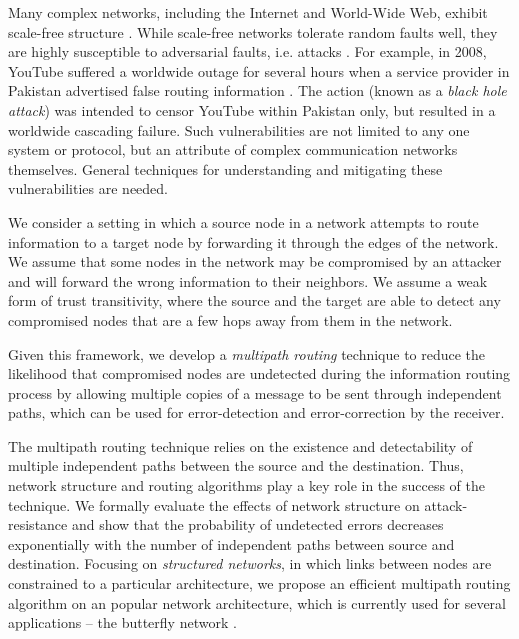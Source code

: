 \documentclass[prodmode,permissions]{acmsmall-ec16}
\begin{document}
Many complex networks, including the Internet and World-Wide Web, exhibit
scale-free structure
\cite{barabasi_emergence_1999,barabasi_scale-free_2009}.
While scale-free networks tolerate random faults well,
they are highly susceptible to adversarial faults, i.e. attacks
\cite{albert_error_2000}.
For example, in 2008, YouTube suffered a worldwide outage for several hours
when a service provider in Pakistan advertised false routing information
\cite{hunter_pakistan_2008}.
The action (known as a {\em black hole attack}) was intended to censor YouTube
within Pakistan only, but resulted in a worldwide cascading failure.
Such vulnerabilities are not limited to any one system or protocol, but an
attribute of complex communication networks themselves.
General techniques for understanding and mitigating these vulnerabilities are
needed.

We consider a setting in which a source node in a network attempts to route information
to a target node by forwarding it through the edges of the network. We 
assume that some nodes in the network may be compromised by an attacker 
and will forward the wrong information to their neighbors. We assume 
a weak form of trust transitivity, where the source and the target are able to 
detect any compromised nodes that are a few hops away from them in the network.

Given this framework, we develop a \emph{multipath routing} technique to reduce 
the likelihood that compromised nodes are undetected during the information 
routing process by allowing multiple copies of a message to be sent through independent paths,
which can be used for error-detection and error-correction by the receiver. 

The multipath routing technique relies on the existence and detectability of
multiple independent paths between the source and the destination. Thus, network 
structure and routing algorithms play a key role in the success of the technique. We formally evaluate the 
effects of network structure on attack-resistance and show that the probability of undetected 
errors decreases exponentially with the number of independent paths between 
source and destination. Focusing on {\em structured networks}, in which links between nodes are 
constrained to a particular architecture, we propose an efficient multipath routing algorithm on an popular network
architecture, which is currently used for several applications -- the butterfly network \cite{}. 
\end{document}
